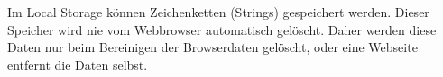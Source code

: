 \label{sec:localstorage}

Im Local Storage können Zeichenketten (Strings) gespeichert werden. 
Dieser Speicher wird nie vom Webbrowser automatisch gelöscht. 
Daher werden diese Daten nur beim Bereinigen der Browserdaten gelöscht, oder eine Webseite entfernt die Daten selbst. 
\cite{w3LocalStorage}

